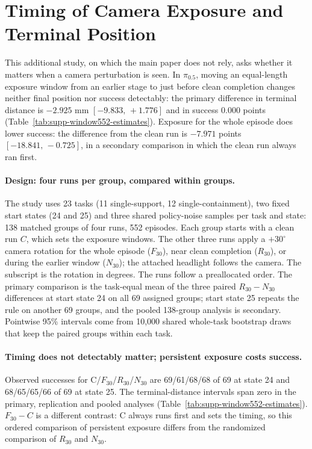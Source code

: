 \section{Timing of Camera Exposure and Terminal Position}
\label{sec:window552}
This additional study, on which the main paper does not rely, asks whether it matters when a camera perturbation is seen. In $\pi_{0.5}$, moving an equal-length exposure window from an earlier stage to just before clean completion changes neither final position nor success detectably: the primary difference in terminal distance is $-2.925$ mm $[-9.833,\,+1.776]$ and in success $0.000$ points (Table~\ref{tab:supp-window552-estimates}). Exposure for the whole episode does lower success: the difference from the clean run is $-7.971$ points $[-18.841,\,-0.725]$, in a secondary comparison in which the clean run always ran first.

\paragraph{Design: four runs per group, compared within groups.}
The study uses 23 tasks (11 single-support, 12 single-containment), two fixed start states (24 and 25) and three shared policy-noise samples per task and state: 138 matched groups of four runs, 552 episodes. Each group starts with a clean run $C$, which sets the exposure windows. The other three runs apply a $+30^\circ$ camera rotation for the whole episode ($F_{30}$), near clean completion ($R_{30}$), or during the earlier window ($N_{30}$); the attached headlight follows the camera. The subscript is the rotation in degrees. The runs follow a preallocated order. The primary comparison is the task-equal mean of the three paired $R_{30}-N_{30}$ differences at start state 24 on all 69 assigned groups; start state 25 repeats the rule on another 69 groups, and the pooled 138-group analysis is secondary. Pointwise 95\% intervals come from 10,000 shared whole-task bootstrap draws that keep the paired groups within each task.

\paragraph{Timing does not detectably matter; persistent exposure costs success.}
Observed successes for C/$F_{30}$/$R_{30}$/$N_{30}$ are 69/61/68/68 of 69 at state 24 and 68/65/65/66 of 69 at state 25. The terminal-distance intervals span zero in the primary, replication and pooled analyses (Table~\ref{tab:supp-window552-estimates}). $F_{30}-C$ is a different contrast: C always runs first and sets the timing, so this ordered comparison of persistent exposure differs from the randomized comparison of $R_{30}$ and $N_{30}$.

